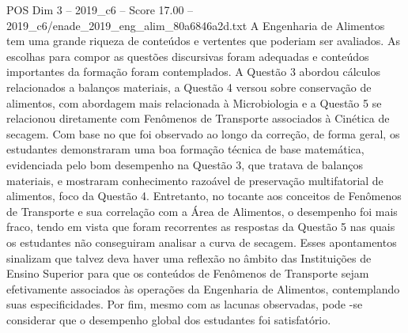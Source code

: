 \begin{textsample}{POS Dim 3 – 2019\_c6 – Score 17.00 – 2019\_c6/enade\_2019\_eng\_alim\_80a6846a2d.txt}
A Engenharia de Alimentos tem uma grande riqueza de conteúdos e vertentes que poderiam ser avaliados.
As escolhas para compor as questões discursivas foram adequadas e conteúdos importantes da formação foram contemplados.
A Questão 3 abordou cálculos relacionados a balanços materiais, a Questão 4 versou sobre conservação de alimentos, com abordagem mais relacionada à Microbiologia e a Questão 5 se relacionou diretamente com Fenômenos de Transporte associados à Cinética de secagem.
Com base no que foi observado ao longo da correção, de forma geral, os estudantes demonstraram uma boa formação técnica de base matemática, evidenciada pelo bom desempenho na Questão 3, que tratava de balanços materiais, e mostraram conhecimento razoável de preservação multifatorial de alimentos, foco da Questão 4.
Entretanto, no tocante aos conceitos de Fenômenos de Transporte e sua correlação com a Área de Alimentos, o desempenho foi mais fraco, tendo em vista que foram recorrentes as respostas da Questão 5 nas quais os estudantes não conseguiram analisar a curva de secagem.
Esses apontamentos sinalizam que talvez deva haver uma reflexão no âmbito das Instituições de Ensino Superior para que os conteúdos de Fenômenos de Transporte sejam efetivamente associados às operações da Engenharia de Alimentos, contemplando suas especificidades.
Por fim, mesmo com as lacunas observadas, pode -se considerar que o desempenho global dos estudantes foi satisfatório.

\end{textsample}
